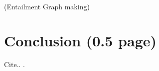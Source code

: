 \documentclass[11pt,letterpaper]{article}
\begin{document}
(Entailment Graph making)


\section{Conclusion (0.5 page)} 

   Cite.. \cite{Katz:1987}.




\end{document}
